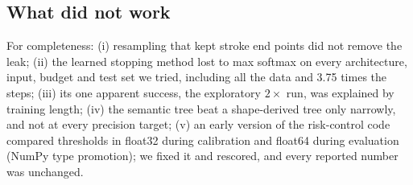 \subsection{What did not work}
\label{sec:res-failed}
For completeness: (i) resampling that kept stroke end points did not remove the leak;
(ii) the learned stopping method lost to max softmax on every architecture, input, budget and test
set we tried, including all the data and 3.75 times the steps; (iii) its one apparent success, the exploratory $2\times$ run, was explained by training
length; (iv) the semantic tree beat a shape-derived tree only narrowly, and not at every precision
target; (v) an early version of the
risk-control code compared thresholds in float32 during calibration and float64 during evaluation
(NumPy type promotion); we fixed it and rescored, and every reported number was unchanged.
